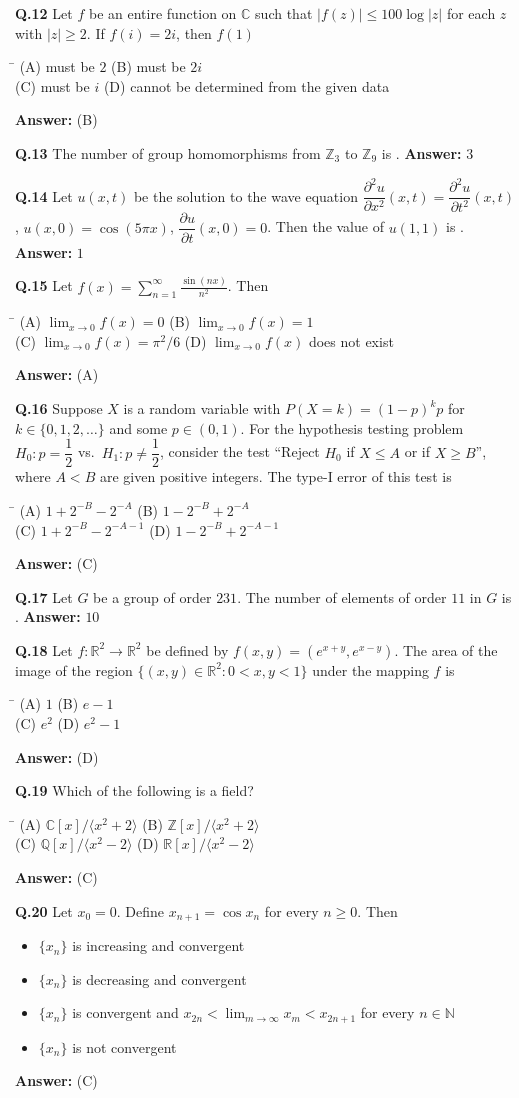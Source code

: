 \documentclass[11pt,a4paper]{article}
\newcommand{\optsfourA}[4]{%
  \begin{tabbing}
    \hspace{0.48\linewidth}\=\kill
    (A) #1 \> (B) #2 \\[2pt]
    (C) #3 \> (D) #4
  \end{tabbing}%
}
\newcommand{\optslistA}[4]{%
  \begin{itemize}
    \setlength{\itemsep}{2pt}\setlength{\parskip}{0pt}
    \item[(A)] #1
    \item[(B)] #2
    \item[(C)] #3
    \item[(D)] #4
  \end{itemize}%
}
\newcommand{\ans}[1]{\textbf{Answer:} #1\par\medskip}
\begin{document}
\textbf{Q.12} Let $f$ be an entire function on $\mathbb{C}$ such that $|f(z)| \le 100\log|z|$ for each $z$ with $|z| \ge 2$. If $f(i) = 2i$, then $f(1)$
\optsfourA{must be $2$}{must be $2i$}{must be $i$}{cannot be determined from the given data}
\ans{(B)}

\textbf{Q.13} The number of group homomorphisms from $\mathbb{Z}_3$ to $\mathbb{Z}_9$ is \underline{\hspace{2cm}}.
\ans{$3$}

\textbf{Q.14} Let $u(x, t)$ be the solution to the wave equation $\dfrac{\partial^2 u}{\partial x^2}(x, t) = \dfrac{\partial^2 u}{\partial t^2}(x, t)$, $u(x, 0) = \cos(5\pi x)$, $\dfrac{\partial u}{\partial t}(x, 0) = 0$. Then the value of $u(1, 1)$ is \underline{\hspace{2cm}}.
\ans{$1$}

\textbf{Q.15} Let $f(x) = \displaystyle\sum_{n=1}^{\infty} \frac{\sin(nx)}{n^2}$. Then
\optsfourA{$\lim_{x\to 0} f(x) = 0$}{$\lim_{x\to 0} f(x) = 1$}{$\lim_{x\to 0} f(x) = \pi^2/6$}{$\lim_{x\to 0} f(x)$ does not exist}
\ans{(A)}

\textbf{Q.16} Suppose $X$ is a random variable with $P(X = k) = (1 - p)^k p$ for $k \in \{0, 1, 2, \dots\}$ and some $p \in (0, 1)$. For the hypothesis testing problem $H_0 : p = \dfrac{1}{2}$ vs.\ $H_1 : p \ne \dfrac{1}{2}$, consider the test ``Reject $H_0$ if $X \le A$ or if $X \ge B$'', where $A < B$ are given positive integers. The type-I error of this test is
\optsfourA{$1 + 2^{-B} - 2^{-A}$}{$1 - 2^{-B} + 2^{-A}$}{$1 + 2^{-B} - 2^{-A-1}$}{$1 - 2^{-B} + 2^{-A-1}$}
\ans{(C)}

\textbf{Q.17} Let $G$ be a group of order $231$. The number of elements of order $11$ in $G$ is \underline{\hspace{2cm}}.
\ans{$10$}

\textbf{Q.18} Let $f : \mathbb{R}^2 \to \mathbb{R}^2$ be defined by $f(x, y) = (e^{x+y}, e^{x-y})$. The area of the image of the region $\{(x, y) \in \mathbb{R}^2 : 0 < x, y < 1\}$ under the mapping $f$ is
\optsfourA{$1$}{$e - 1$}{$e^2$}{$e^2 - 1$}
\ans{(D)}

\textbf{Q.19} Which of the following is a field?
\optsfourA{$\mathbb{C}[x]/\langle x^2 + 2 \rangle$}{$\mathbb{Z}[x]/\langle x^2 + 2 \rangle$}{$\mathbb{Q}[x]/\langle x^2 - 2 \rangle$}{$\mathbb{R}[x]/\langle x^2 - 2 \rangle$}
\ans{(C)}

\textbf{Q.20} Let $x_0 = 0$. Define $x_{n+1} = \cos x_n$ for every $n \ge 0$. Then
\optslistA{$\{x_n\}$ is increasing and convergent}{$\{x_n\}$ is decreasing and convergent}{$\{x_n\}$ is convergent and $x_{2n} < \lim_{m\to\infty} x_m < x_{2n+1}$ for every $n \in \mathbb{N}$}{$\{x_n\}$ is not convergent}
\ans{(C)}
\end{document}

